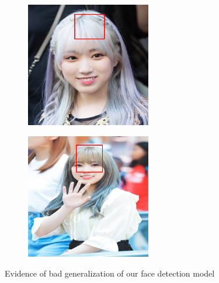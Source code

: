 \begin{figure}[htbp]
    \centering
    \begin{subfigure}{0.495\textwidth}
        \centering
        \includegraphics[width=0.6\textwidth]{images/faceDetec/training/bad-generalization.png}
    \end{subfigure}
    \hfill
    \begin{subfigure}{0.495\textwidth}
        \centering
        \includegraphics[width=0.6\textwidth]{images/faceDetec/training/bad-generalization-2.png}
    \end{subfigure}
    \caption{
        Evidence of bad generalization of our face detection model
    }
    \label{Figure:Face-Detection:training:bad-generalization}
\end{figure}

